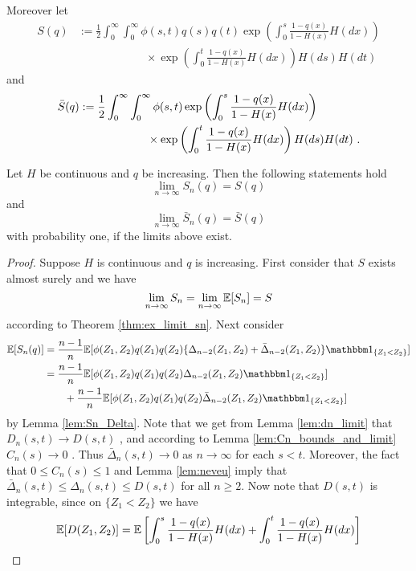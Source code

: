 Moreover let
\begin{align*}
	S(q) &:= \frac{1}{2}\int_{0}^{\infty} \int_{0}^{\infty} \phi(s,t) q(s)q(t) \exp\left(\int_{0}^{s} \frac{1-q(x)}{1-H(x)} H(dx)\right)\\
	&\qquad\qquad\qquad \times \exp\left(\int_{0}^{t} \frac{1-q(x)}{1-H(x)} H(dx) \right)H(ds)H(dt)
\end{align*}
and 
\begin{align*}
	\bar{S}(q) &:= \frac{1}{2}\int_{0}^{\infty} \int_{0}^{\infty} \phi(s,t)  \exp\left(\int_{0}^{s} \frac{1-q(x)}{1-H(x)} H(dx)\right)\\
	&\qquad\qquad\qquad \times \exp\left(\int_{0}^{t} \frac{1-q(x)}{1-H(x)} H(dx) \right)H(ds)H(dt)\textrm{ .}
\end{align*}

\begin{lemma}
	Let $H$ be continuous and $q$ be increasing. Then the following statements hold
	$$\lim\limits_{n\to\infty} S_n(q) = S(q)$$
	and 
	$$\lim\limits_{n\to\infty} \bar{S}_n(q) = \bar{S}(q)$$
	with probability one, if the limits above exist.
	\label{lem:sn_limit}
	\begin{proof}
		Suppose $H$ is continuous and $q$ is increasing. First consider that $S$ exists almost surely and we have
		$$\lim\limits_{n\to\infty} S_n = \lim\limits_{n\to\infty} \mathbb{E}[S_n] = S$$
		according to Theorem \ref{thm:ex_limit_sn}. Next consider
		\begin{align*}
			\E[S_n(q)] &= \frac{n-1}{n} \E[\phi(Z_1,Z_2)q(Z_1)q(Z_2)\{\Delta_{n-2}(Z_1, Z_2) + \bar\Delta_{n-2}(Z_1, Z_2)\} \I{Z_1<Z_2}]	\\
			&= \frac{n-1}{n} \E[\phi(Z_1,Z_2)q(Z_1)q(Z_2)\Delta_{n-2}(Z_1, Z_2)\I{Z_1<Z_2}]\\
			&\qquad + \frac{n-1}{n} \E[\phi(Z_1,Z_2)q(Z_1)q(Z_2) \bar\Delta_{n-2}(Z_1, Z_2) \I{Z_1<Z_2}]
		\end{align*}
		by Lemma \ref{lem:Sn_Delta}. 
		Note that we get from Lemma \ref{lem:dn_limit} that $D_n(s,t) \to D(s,t)$ \wpo, and according to Lemma \ref{lem:Cn_bounds_and_limit} $C_n(s) \to 0$ \wpo. Thus $\bar{\Delta}_n(s,t) \to 0$ as $n\to\infty$ for each $s<t$.
		Moreover, the fact that $0\leq C_n(s)\leq 1$ and Lemma \ref{lem:neveu} imply that $\bar{\Delta}_n(s,t) \leq \Delta_n(s,t) \leq D(s,t)$ for all $n\geq 2$. Now note that $D(s,t)$ is integrable, since on $\{Z_1<Z_2\}$ we have
		\begin{align*}
			\E[D(Z_1,Z_2)] &= \E\left[\int_{0}^{s} \frac{1-q(x)}{1-H(x)} H(dx) + \int_{0}^{t} \frac{1-q(x)}{1-H(x)} H(dx)\right]\\

\end{align*}
\end{proof}
\end{lemma}
